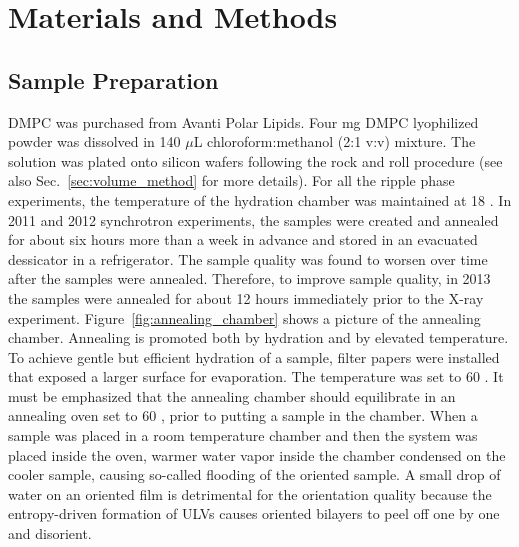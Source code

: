 \newpage
\section{Materials and Methods}\label{sec:ripple_MMs}
\subsection{Sample Preparation}\label{sec:ripple_sample_prep}
DMPC was purchased from Avanti Polar Lipids.
Four mg DMPC lyophilized powder was dissolved in 140 $\mu$L
chloroform:methanol (2:1 v:v) 
mixture. The solution was plated onto silicon wafers following the rock and
roll procedure \cite{Tristram-Nagle07_MMB}
(see also Sec.~\ref{sec:volume_method} for more details).
For all the ripple phase experiments, the temperature of the hydration 
chamber was maintained at 18 \textcelsius. 
In 2011 and 2012 synchrotron experiments, the samples were created and annealed 
for about six hours more than a week in advance and stored in an evacuated
dessicator in a refrigerator. The sample quality 
was found to worsen over time
after the samples were annealed. Therefore, to improve sample quality, 
in 2013 the 
samples were annealed for about 12 hours immediately prior to the X-ray experiment.
Figure~\ref{fig:annealing_chamber} shows a picture of the annealing chamber.
Annealing is promoted both by hydration and by elevated temperature. 
To achieve gentle but efficient hydration of a sample, filter papers were installed
that exposed a larger surface for evaporation. The temperature was set to
60 \textcelsius.
It must be emphasized that the annealing 
chamber should equilibrate in an annealing oven set to 60 \textcelsius,
prior to putting a sample in the chamber.
When a sample was placed in a room temperature chamber and
then the system was placed inside the oven, warmer water vapor inside the chamber 
condensed on the cooler sample, causing so-called flooding of the oriented sample. 
A small drop of water on an oriented film is detrimental for the orientation quality because the
entropy-driven formation of ULVs causes oriented bilayers to 
peel off one by one and disorient. 

